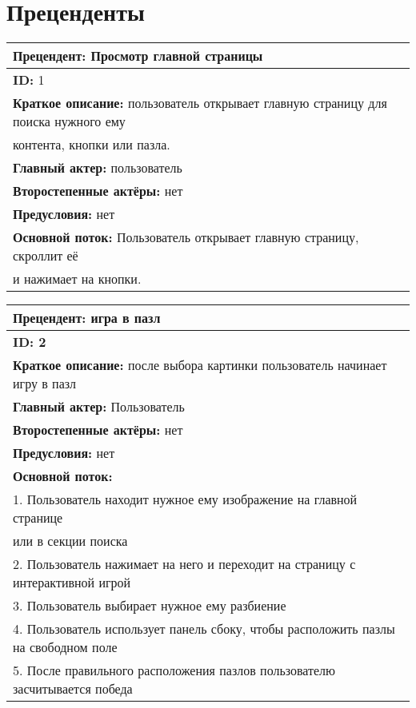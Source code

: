 \documentclass[12pt]{article}
\begin{document}
\section{Преценденты}

\begin{table}[H]
\begin{tabular}{|l|}
    \hline
    \textbf{Прецендент:} Просмотр главной страницы \\
    \hline
    \textbf{ID:} 1 \\
    \hline
    \textbf{Краткое описание:} пользователь открывает главную страницу для поиска нужного ему \\
    контента, кнопки или пазла. \\
    \hline
    \textbf{Главный актер:} пользователь \\
    \hline
    \textbf{Второстепенные актёры:} нет \\
    \hline
    \textbf{Предусловия:} нет \\
    \hline 
    \textbf{Основной поток:} Пользователь открывает главную страницу, скроллит её \\и нажимает на кнопки.\\
    \hline
\end{tabular}
\end{table}

\begin{table}[H]
\begin{tabular}{|l|}
    \hline
    \textbf{Прецендент: игра в пазл} \\
    \hline
    \textbf{ID: 2} \\
    \hline
    \textbf{Краткое описание:} после выбора картинки пользователь начинает игру в пазл \\
    \hline
    \textbf{Главный актер:} Пользователь \\
    \hline
    \textbf{Второстепенные актёры:} нет \\
    \hline
    \textbf{Предусловия:} нет \\
    \hline 
    \textbf{Основной поток:} \\
    1. Пользователь находит нужное ему изображение на главной странице \\
    или в секции поиска \\
    2. Пользователь нажимает на него и переходит на страницу с интерактивной игрой \\
    3. Пользователь выбирает нужное ему разбиение \\
    4. Пользователь использует панель сбоку, чтобы расположить пазлы на свободном поле \\
    5. После правильного расположения пазлов пользователю засчитывается победа \\
    \hline
\end{tabular}
\end{table}
\end{document}
